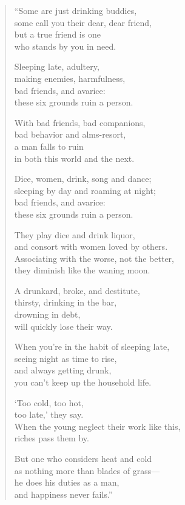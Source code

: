 \documentclass[12pt,openany]{book}%
\begin{document}
\begin{verse}%
“Some are just drinking buddies, \\
some call you their dear, dear friend, \\
but a true friend is one \\
who stands by you in need. 

Sleeping late, adultery, \\
making enemies, harmfulness, \\
bad friends, and avarice: \\
these six grounds ruin a person. 

With bad friends, bad companions, \\
bad behavior and alms-resort, \\
a man falls to ruin \\
in both this world and the next. 

Dice, women, drink, song and dance; \\
sleeping by day and roaming at night; \\
bad friends, and avarice: \\
these six grounds ruin a person. 

They play dice and drink liquor, \\
and consort with women loved by others. \\
Associating with the worse, not the better, \\
they diminish like the waning moon. 

A drunkard, broke, and destitute, \\
thirsty, drinking in the bar, \\
drowning in debt, \\
will quickly lose their way. 

When you’re in the habit of sleeping late, \\
seeing night as time to rise, \\
and always getting drunk, \\
you can’t keep up the household life. 

‘Too cold, too hot, \\
too late,’ they say. \\
When the young neglect their work like this, \\
riches pass them by. 

But one who considers heat and cold \\
as nothing more than blades of grass—\\
he does his duties as a man, \\
and happiness never fails.” 

%
\end{verse}
\end{document}
